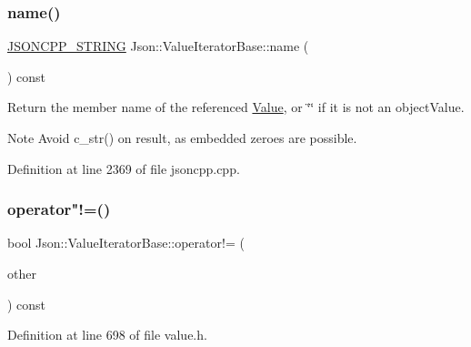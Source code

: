 \subsubsection{\texorpdfstring{name()}{name()}\hspace{0.1cm}{\footnotesize\ttfamily [2/2]}}
{\footnotesize\ttfamily \hyperlink{config_8h_a1e723f95759de062585bc4a8fd3fa4be}{J\+S\+O\+N\+C\+P\+P\+\_\+\+S\+T\+R\+I\+NG} Json\+::\+Value\+Iterator\+Base\+::name (\begin{DoxyParamCaption}{ }\end{DoxyParamCaption}) const}

Return the member name of the referenced \hyperlink{class_json_1_1_value}{Value}, or \char`\"{}\char`\"{} if it is not an object\+Value. \begin{DoxyNote}{Note}
Avoid {\ttfamily c\+\_\+str()} on result, as embedded zeroes are possible. 
\end{DoxyNote}


Definition at line 2369 of file jsoncpp.\+cpp.

\hypertarget{class_json_1_1_value_iterator_base_aa83bdcc8114b7d040eb8eb42eeed5f4a}{}\label{class_json_1_1_value_iterator_base_aa83bdcc8114b7d040eb8eb42eeed5f4a} 
\subsubsection{\texorpdfstring{operator"!=()}{operator!=()}\hspace{0.1cm}{\footnotesize\ttfamily [1/2]}}
{\footnotesize\ttfamily bool Json\+::\+Value\+Iterator\+Base\+::operator!= (\begin{DoxyParamCaption}\item[{const \hyperlink{class_json_1_1_value_iterator_base_a9d2a940d03ea06d20d972f41a89149ee}{Self\+Type} \&}]{other }\end{DoxyParamCaption}) const\hspace{0.3cm}{\ttfamily [inline]}}



Definition at line 698 of file value.\+h.

\hypertarget{class_json_1_1_value_iterator_base_aa83bdcc8114b7d040eb8eb42eeed5f4a}{}\label{class_json_1_1_value_iterator_base_aa83bdcc8114b7d040eb8eb42eeed5f4a} 
